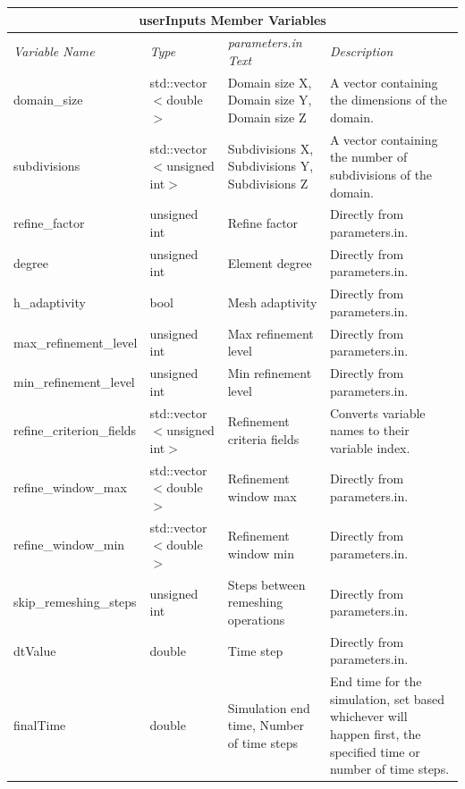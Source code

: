 \documentclass[10pt]{article} %
\begin{document}
\begin{center}
    \begin{tabular}{ | p{} | p{} |p{} | p{} |}
    \hline
      \multicolumn{4}{|c|}{\textbf{userInputs Member Variables}} \\
    \hline
    \hline
    \emph{Variable Name} & \emph{Type} & \emph{parameters.in Text} & \emph{Description} \\ \hline
      domain\_size & std::vector$<$double$>$ & Domain size X, Domain size Y, Domain size Z & A vector containing the dimensions of the domain. \\ \hline
      subdivisions & std::vector$<$unsigned int$>$ & Subdivisions X, Subdivisions Y, Subdivisions Z & A vector containing the number of subdivisions of the domain. \\ \hline
       refine\_factor & unsigned int & Refine factor & Directly from parameters.in. \\ \hline
       degree & unsigned int & Element degree & Directly from parameters.in. \\ \hline
        h\_adaptivity & bool & Mesh adaptivity & Directly from parameters.in. \\ \hline
        max\_refinement\_level & unsigned int & Max refinement level & Directly from parameters.in. \\ \hline
        min\_refinement\_level & unsigned int & Min refinement level & Directly from parameters.in. \\ \hline
        refine\_criterion\_fields & std::vector$<$unsigned int$>$ & Refinement criteria fields & Converts variable names to their variable index. \\ \hline
        refine\_window\_max & std::vector$<$double$>$ & Refinement window max & Directly from parameters.in. \\ \hline
        refine\_window\_min & std::vector$<$double$>$ & Refinement window min & Directly from parameters.in. \\ \hline
       skip\_remeshing\_steps & unsigned int & Steps between remeshing operations & Directly from parameters.in. \\ \hline
          dtValue & double & Time step & Directly from parameters.in. \\ \hline
          finalTime & double & Simulation end time, Number of time steps & End time for the simulation, set based whichever will happen first, the specified time or number of time steps. \\ \hline

\end{tabular}
\end{center}
\end{document}
